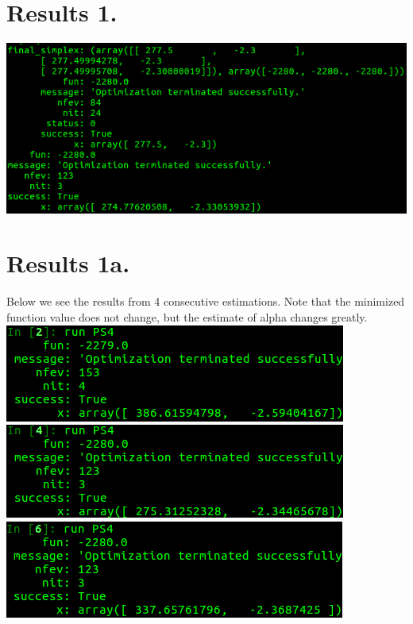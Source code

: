 \documentclass{article}
\begin{document}
\section*{Results 1.}
\includegraphics[scale = .65]{Results1}

\newpage
\section*{Results 1a.}
Below we see the results from 4 consecutive estimations. Note that the minimized function value does not change, but the estimate of alpha changes greatly.\\


\includegraphics[scale = .65]{Results1A_1}\\

\includegraphics[scale = .65]{Results1A_2}\\

\includegraphics[scale = .65]{Results1A_3}\\
\end{document}
